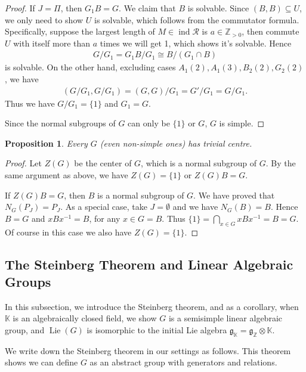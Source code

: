 \documentclass[12pt]{amsart}
\newtheorem{proposition}[theorem]{Proposition}
\begin{document}
\begin{proof}
    If $J = \Pi$, then $G_1B=G$.
    We claim that $B$ is solvable.
    Since $(B,B)\subseteq  U$, we only need to show $U$ is solvable, which follows from the commutator formula.
    Specifically, suppose the largest length of $ M\in \operatorname{ind}\mathcal{R}$ is $a\in \mathbb{Z}_{>0}$, then commute $U$ with itself more than $a$ times we will get 1, which shows it's solvable.
    Hence 
    \begin{align*}
        G/G_1 = G_1B/G_1 \cong B/(G_1\cap B)
    \end{align*}
    is solvable.
    On the other hand, excluding cases $A_1(2),A_1(3),B_2(2),G_2(2)$, we have 
    \begin{align*}
        (G/G_1,G/G_1) = (G,G)/G_1 = G'/G_1 = G/G_1.
    \end{align*}
    Thus we have $G/G_1=\{1\}$ and $G_1=G$.

    Since the normal subgroups of $G$ can only be $\{1\}$ or $G$, $G$ is simple.
\end{proof}

\begin{proposition}
    Every $G$ (even non-simple ones) has trivial centre.
\end{proposition}

\begin{proof}
    Let $Z(G)$ be the center of $G$, which is a normal subgroup of $G$. 
    By the same argument as above, we have $Z(G) = \{1\}$ or $Z(G)B=G$.

    If $Z(G)B=G$, then $B$ is a normal subgroup of $G$. 
    We have proved that $N_G(P_J) = P_J$. 
    As a special case, take $J=\emptyset$ and we have $N_G(B) = B$. 
    Hence $B=G$ and $xBx^{-1} = B$, for any $ x\in G=B$.
    Thus $ \{1\} = \bigcap\limits_{x\in G} xBx^{-1} =B =G$.
    Of course in this case we also have $Z(G)=\{1\}$.
\end{proof}




\subsection{The Steinberg Theorem and Linear Algebraic Groups}
In this subsection, we introduce the Steinberg theorem, and as a corollary, when $\mathbb{K}$ is an algebraically closed field, we show $G$ is a semisimple linear algebraic group, and $\operatorname{Lie}(G)$ is isomorphic to the initial Lie algebra $\mathfrak{g}_{\mathbb{K}}=\mathfrak{g}_{\mathbb{Z}}\otimes \mathbb{K}$.

We write down the Steinberg theorem in our settings as follows.
This theorem shows we can define $G$ as an abstract group with generators and relations.
\end{document}
